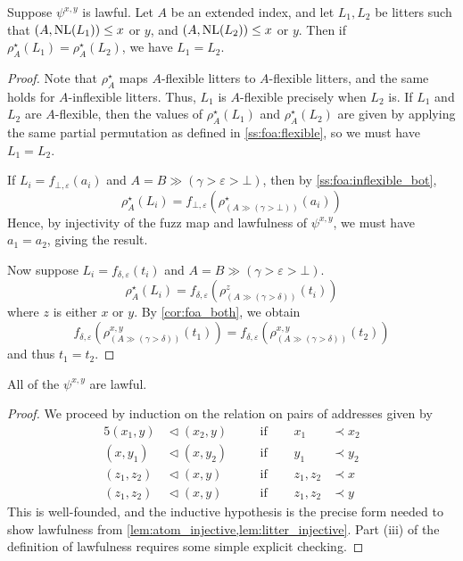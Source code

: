 \begin{lemma}
    \label{lem:litter_injective}
    Suppose \( \psi^{x,y} \) is lawful.
    Let \( A \) be an extended index, and let \( L_1, L_2 \) be litters such that \( (A, \operatorname{NL}(L_1)) \leq x \) or \( y \), and \( (A, \operatorname{NL}(L_2)) \leq x \) or \( y \).
    Then if \( \rho^\star_A(L_1) = \rho^\star_A(L_2) \), we have \( L_1 = L_2 \).
\end{lemma}
\begin{proof}
    Note that \( \rho^\star_A \) maps \( A \)-flexible litters to \( A \)-flexible litters, and the same holds for \( A \)-inflexible litters.
    Thus, \( L_1 \) is \( A \)-flexible precisely when \( L_2 \) is.
    If \( L_1 \) and \( L_2 \) are \( A \)-flexible, then the values of \( \rho^\star_A(L_1) \) and \( \rho^\star_A(L_2) \) are given by applying the same partial permutation as defined in \cref{ss:foa:flexible}, so we must have \( L_1 = L_2 \).

    If \( L_i = f_{\bot,\varepsilon}(a_i) \) and \( A = B \gg (\gamma > \varepsilon > \bot) \), then by \cref{ss:foa:inflexible_bot},
    \[ \rho^\star_A(L_i) = f_{\bot,\varepsilon}(\rho^\star_{(A \gg (\gamma > \bot))}(a_i)) \]
    Hence, by injectivity of the fuzz map and lawfulness of \( \psi^{x,y} \), we must have \( a_1 = a_2 \), giving the result.

    Now suppose \( L_i = f_{\delta,\varepsilon}(t_i) \) and \( A = B \gg (\gamma > \varepsilon > \bot) \).
    \[ \rho^\star_A(L_i) = f_{\delta,\varepsilon}(\rho^z_{(A \gg (\gamma > \delta))}(t_i)) \]
    where \( z \) is either \( x \) or \( y \).
    By \cref{cor:foa_both}, we obtain
    \[ f_{\delta,\varepsilon}(\rho^{x,y}_{(A \gg (\gamma > \delta))}(t_1)) = f_{\delta,\varepsilon}(\rho^{x,y}_{(A \gg (\gamma > \delta))}(t_2)) \]
    and thus \( t_1 = t_2 \).
\end{proof}

\begin{lemma}
    All of the \( \psi^{x,y} \) are lawful.
\end{lemma}
\begin{proof}
    We proceed by induction on the relation on pairs of addresses given by
    \begin{alignat*}{5}
        (x_1, y) &\vartriangleleft (x_2, y) && \quad\text{if }\quad & x_1 &\prec x_2 \\
        (x, y_1) &\vartriangleleft (x, y_2) && \quad\text{if }\quad & y_1 &\prec y_2 \\
        (z_1, z_2) &\vartriangleleft (x, y) && \quad\text{if }\quad & z_1, z_2 &\prec x \\
        (z_1, z_2) &\vartriangleleft (x, y) && \quad\text{if }\quad & z_1, z_2 &\prec y
    \end{alignat*}
    This is well-founded, and the inductive hypothesis is the precise form needed to show lawfulness from \cref{lem:atom_injective,lem:litter_injective}.
    Part (iii) of the definition of lawfulness requires some simple explicit checking.
\end{proof}

